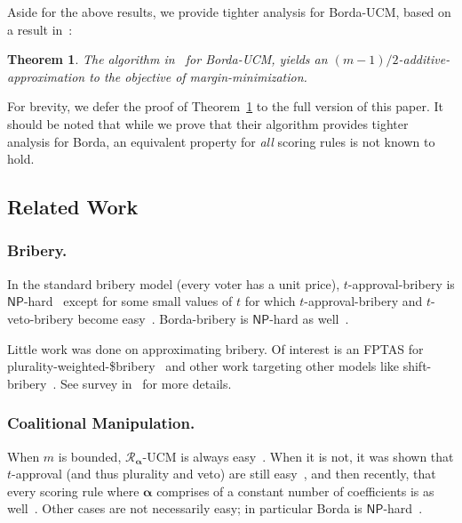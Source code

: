 \documentclass[letterpaper]{article} %
\newtheorem{theorem}{Theorem}
\theoremstyle{definition}
\newcommand\vecgreek{\bm}
\newcommand{\veca}{\vecgreek{\alpha}}
\newcommand{\Ra}{\mathcal{R}_{\veca}}
\newcommand{\NP}{\mathsf{NP}}
\begin{document}
Aside for the above results, we provide tighter analysis for Borda-UCM, based on a result in~\cite{DBLP:journals/ai/ZuckermanPR09}:
\begin{theorem}\label{thr:zuck}
	The algorithm in~\cite{DBLP:journals/ai/ZuckermanPR09} for Borda-UCM, yields an $(m-1)/2$-additive-approximation to the objective of margin-minimization.
\end{theorem}
For brevity, we defer the proof of Theorem~\ref{thr:zuck} to the full version of this paper. It should be noted that while we prove that their algorithm provides tighter analysis for Borda, an equivalent property for \emph{all}  scoring rules is not known to hold. 


\subsection{Related Work}
\subsubsection{Bribery.}
In the standard bribery model (every voter has a unit price), $t$-approval-bribery is $\NP$-hard~\cite{lin2012solving} except for some small values of $t$ for which $t$-approval-bribery and $t$-veto-bribery become easy~\cite{DBLP:journals/jair/FaliszewskiHH09}. Borda-bribery is $\NP$-hard as well~\cite{DBLP:conf/aaai/BrelsfordFHSS08}. 

Little work was done on approximating bribery. Of interest is an FPTAS for plurality-weighted-\$bribery~\cite{DBLP:conf/atal/Faliszewski08} and other work
targeting other models like  shift-bribery~\cite{DBLP:conf/sagt/ElkindFS09,DBLP:conf/wine/ElkindF10,DBLP:journals/iandc/BredereckCFNN16}. See survey in~\cite{DBLP:reference/choice/FaliszewskiR16} for more details. 



\subsubsection{Coalitional Manipulation.} When $m$ is bounded, $\Ra$-UCM is always easy~\cite{DBLP:journals/jacm/ConitzerSL07}. When it is not, it was shown that $t$-approval (and thus plurality and veto) are still easy~\cite{DBLP:journals/ai/ZuckermanPR09,lin2012solving}, and then recently, that every scoring rule where $\veca$ comprises of a constant number of coefficients is as well~\cite{DBLP:conf/ecai/HemaspaandraS16}.
Other cases are not necessarily easy; in particular Borda is $\NP$-hard~\cite{DBLP:conf/ijcai/BetzlerNW11,DBLP:journals/ai/DaviesKNWX14}. 
\end{document}
